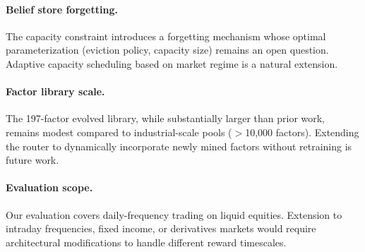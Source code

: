 \paragraph{Belief store forgetting.} The capacity constraint introduces a forgetting mechanism whose optimal parameterization (eviction policy, capacity size) remains an open question. Adaptive capacity scheduling based on market regime is a natural extension.

\paragraph{Factor library scale.} The 197-factor evolved library, while substantially larger than prior work, remains modest compared to industrial-scale pools ($>$10,000 factors). Extending the router to dynamically incorporate newly mined factors without retraining is future work.

\paragraph{Evaluation scope.} Our evaluation covers daily-frequency trading on liquid equities. Extension to intraday frequencies, fixed income, or derivatives markets would require architectural modifications to handle different reward timescales.
